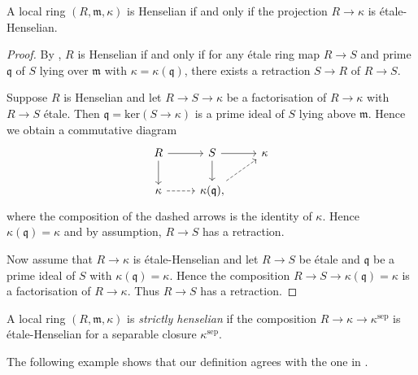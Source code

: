 \begin{example}
    A local ring $(R, \mathfrak{m}, \kappa)$ is Henselian if and only if the projection $R \to \kappa$ is étale-Henselian.
\end{example}

\begin{proof}
    By {\cite[\href{https://stacks.math.columbia.edu/tag/04GG}{Tag 04GG}]{stacks-project}}, $R$ is Henselian if and only if
    for any étale ring map $R \to S$ and prime $\mathfrak{q}$ of $S$ lying over $\mathfrak{m}$ with $\kappa = \kappa(\mathfrak{q})$,
    there exists a retraction $S \to R$ of $R \to S$.

    Suppose $R$ is Henselian and let $R \to S \to \kappa$ be a factorisation of $R \to \kappa$ with $R \to S$ étale. Then
    $\mathfrak{q} = \mathrm{ker}(S \to \kappa)$ is a prime ideal of $S$ lying above $\mathfrak{m}$. Hence we obtain a commutative
    diagram
    \[
        \begin{tikzcd}
        R \arrow{r} \arrow{d} & S \arrow{r} \arrow{d} & \kappa \\
        \kappa \arrow[dashed]{r} & \kappa(\mathfrak{q}) \arrow[dashed]{ur},
        \end{tikzcd}
    \] where the composition of the dashed arrows is the identity of $\kappa$. Hence $\kappa(\mathfrak{q}) = \kappa$ and by assumption,
    $R \to S$ has a retraction.

    Now assume that $R \to \kappa$ is étale-Henselian and let $R \to S$ be étale and $\mathfrak{q}$ be a prime ideal of $S$ with
    $\kappa(\mathfrak{q}) = \kappa$. Hence the composition $R \to S \to \kappa(\mathfrak{q}) = \kappa$ is a factorisation
    of $R \to \kappa$. Thus $R \to S$ has a retraction.
\end{proof}


\begin{definition}
    \label{def:strictly-henselian-local-ring}
    A local ring $(R, \mathfrak{m}, \kappa)$ is \emph{strictly henselian} if the composition $R \to \kappa \to \kappa^{\mathrm{sep}}$ is étale-Henselian
    for a separable closure $\kappa^{\mathrm{sep}}$.
\end{definition}

The following example shows that our definition agrees with the one in
\cite[\href{https://stacks.math.columbia.edu/tag/04GF}{Tag 04GF}]{stacks-project}.

